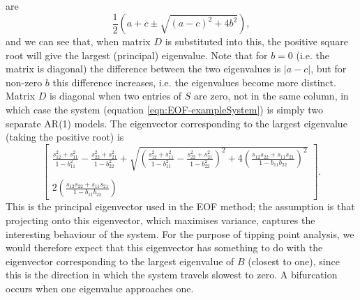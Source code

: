 are 
\begin{equation}
\frac{1}{2}\left(a+c\pm\sqrt{(a-c)^2+4b^2}\right),
\label{eqn:EOF-generalEigenvalues}
\end{equation}
and we can see that, when matrix $D$ is substituted into this, the positive square root will give the largest (principal) eigenvalue. Note that for $b=0$ (i.e. the matrix is diagonal) the difference between the two eigenvalues is $|a-c|$, but for non-zero $b$ this difference increases, i.e. the eigenvalues become more distinct. Matrix $D$ is diagonal when two entries of $S$ are zero, not in the same column, in which case the system (equation \ref{eqn:EOF-exampleSystem}) is simply two separate AR(1) models. The eigenvector corresponding to the largest eigenvalue (taking the positive root) is 
\begin{equation}
\left[\begin{array}{c}
\frac{s_{12}^2+s_{11}^2}{1-b_{11}^2}-\frac{s_{22}^2+s_{21}^2}{1-b_{22}^2} + \sqrt{\left(\frac{s_{12}^2+s_{11}^2}{1-b_{11}^2}-\frac{s_{22}^2+s_{21}^2}{1-b_{22}^2}\right)^2+4\left(\frac{s_{12}s_{22}+s_{11}s_{21}}{1-b_{11}b_{22}}\right)^2}\\
~\\
2\left(\frac{s_{12}s_{22}+s_{11}s_{21}}{1-b_{11}b_{22}}
\right)
\end{array}\right].
\label{eqn:EOF-2x2eigenvector}
\end{equation}
This is the principal eigenvector used in the EOF method; the assumption is that projecting onto this eigenvector, which maximises variance, captures the interesting behaviour of the system. For the purpose of tipping point analysis, we would therefore expect that this eigenvector has something to do with the eigenvector corresponding to the largest eigenvalue of $B$ (closest to one), since this is the direction in which the system travels slowest to zero. A bifurcation occurs when one eigenvalue approaches one. 

